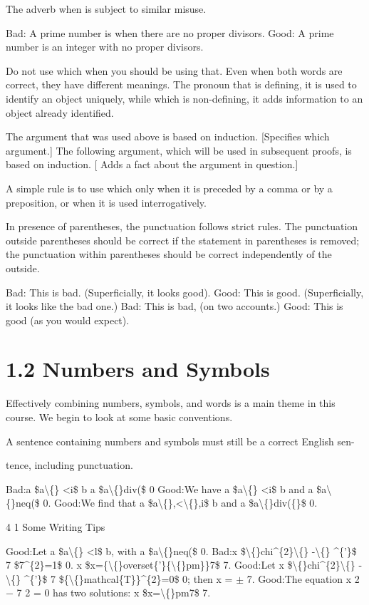 \documentclass[11pt]{article}
\theoremstyle{plain}
\theoremstyle{definition}
\begin{document}
The adverb when is subject to similar misuse.

Bad: A prime number is when there are no proper divisors. Good: A prime number is an integer with no proper divisors.

\textbullet{} Do not use which when you should be using that. Even when both words are correct, they have different meanings. The pronoun that is defining, it is used to identify an object uniquely, while which is non-defining, it adds information to an object already identified.

The argument that was used above is based on induction. [Specifies which argument.] The following argument, which will be used in subsequent proofs, is based on induction. [ Adds a fact about the argument in question.]

A simple rule is to use which only when it is preceded by a comma or by a preposition, or when it is used interrogatively.

\textbullet{} In presence of parentheses, the punctuation follows strict rules. The punctuation outside parentheses should be correct if the statement in parentheses is removed; the punctuation within parentheses should be correct independently of the outside.

Bad: This is bad. (Superficially, it looks good). Good: This is good. (Superficially, it looks like the bad one.) Bad: This is bad, (on two accounts.) Good: This is good (as you would expect).

\section{1.2 Numbers and Symbols}

Effectively combining numbers, symbols, and words is a main theme in this course. We begin to look at some basic conventions.

\textbullet{} A sentence containing numbers and symbols must still be a correct English sen-

tence, including punctuation.

Bad:a \$a\textbackslash\{\} <i\$ b a \$a\textbackslash\{\}div(\$ 0 Good:We have a \$a\textbackslash\{\} <i\$ b and a \$a\textbackslash\{\}neq(\$ 0. Good:We find that a \$a\textbackslash\{\},<\textbackslash\{\},i\$ b and a \$a\textbackslash\{\}div(\{\}\$ 0.

4 1 Some Writing Tips

Good:Let a \$a\textbackslash\{\} <l\$ b, with a \$a\textbackslash\{\}neq(\$ 0. Bad:x \$\textbackslash\{\}chi\textasciicircum{}\{2\}\textbackslash\{\} -\textbackslash\{\} \textasciicircum{}\{'\}\$ 7 \$7\textasciicircum{}\{2\}=1\$ 0. x \$x=\{\textbackslash\{\}overset\{'\}\{\textbackslash\{\}pm\}\}7\$ 7. Good:Let x \$\textbackslash\{\}chi\textasciicircum{}\{2\}\textbackslash\{\} -\textbackslash\{\} \textasciicircum{}\{'\}\$ 7 \$\{\textbackslash\{\}mathcal\{T\}\}\textasciicircum{}\{2\}=0\$ 0; then x = $\pm$ 7. Good:The equation x 2 $-$ 7 2 = 0 has two solutions: x \$x=\textbackslash\{\}pm7\$ 7.
\end{document}
